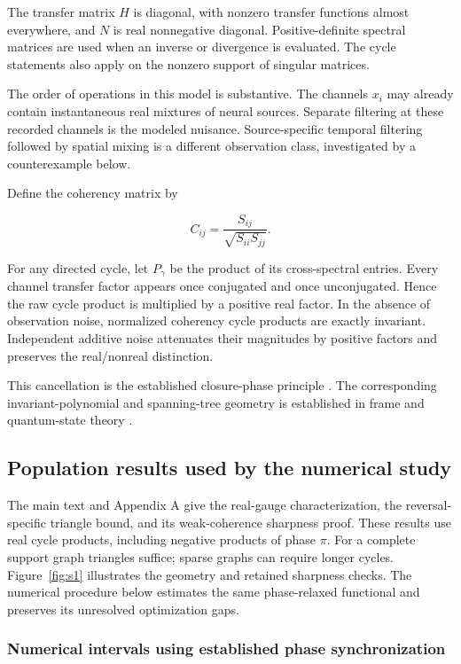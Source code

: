 \documentclass[11pt,a4paper]{article}
\begin{document}
The transfer matrix \(H\) is diagonal, with nonzero transfer functions almost everywhere, and $N$ is real nonnegative diagonal. Positive-definite spectral matrices are used when an inverse or divergence is evaluated. The cycle statements also apply on the nonzero support of singular matrices.

The order of operations in this model is substantive. The channels $x_{i}$ may already contain instantaneous real mixtures of neural sources. Separate filtering at these recorded channels is the modeled nuisance. Source-specific temporal filtering followed by spatial mixing is a different observation class, investigated by a counterexample below.

Define the coherency matrix by

\[C_{ij}=\frac{S_{ij}}{\sqrt{S_{ii}S_{jj}}}.\]

For any directed cycle, let \(P_\gamma\) be the product of its cross-spectral entries. Every channel transfer factor appears once conjugated and once unconjugated. Hence the raw cycle product is multiplied by a positive real factor. In the absence of observation noise, normalized coherency cycle products are exactly invariant. Independent additive noise attenuates their magnitudes by positive factors and preserves the real/nonreal distinction.

This cancellation is the established closure-phase principle \cite{thyagarajan2022}. The corresponding invariant-polynomial and spanning-tree geometry is established in frame and quantum-state theory \cite{chien2016,oszmaniec2024}.

\subsection{Population results used by the numerical study}
The main text and Appendix A give the real-gauge characterization, the reversal-specific triangle bound, and its weak-coherence sharpness proof. These results use real cycle products, including negative products of phase $\pi$. For a complete support graph triangles suffice; sparse graphs can require longer cycles. Figure~\ref{fig:s1} illustrates the geometry and retained sharpness checks. The numerical procedure below estimates the same phase-relaxed functional and preserves its unresolved optimization gaps.

\subsubsection{Numerical intervals using established phase synchronization}
\end{document}
